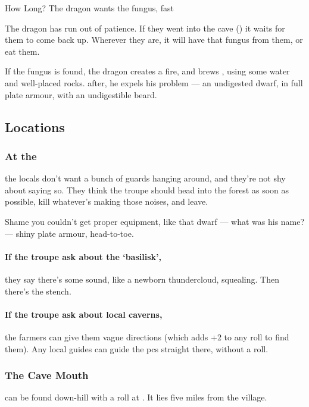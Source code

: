 \documentclass[10pt,twoside]{book}
\begin{document}
{How Long?}%
{The dragon wants the fungus, fast}%

The dragon has run out of patience.
If they went into the cave () it waits for them to come back up.
Wherever they are, it will have that fungus from them, or eat them.

If the fungus is found, the dragon creates a fire, and brews , using some water and well-placed rocks.
 after, he expels his problem --- an undigested dwarf, in full plate armour, with an undigestible beard.

\subsection{Locations}

\subsubsection{At the }\label{wyrmBailey}
the locals don't want a bunch of \glspl{guard} hanging around, and they're not shy about saying so.
They think the troupe should head into the forest as soon as possible, kill whatever's making those noises, and leave.

\begin{speechtext}
  Shame you couldn't get proper equipment, like that dwarf --- what was his name? --- shiny plate armour, head-to-toe.
\end{speechtext}

\paragraph{If the troupe ask about the `\gls{basilisk}',}
they say there's some sound, like a newborn thundercloud, squealing.
Then there's the stench.

\paragraph{If the troupe ask about local caverns,}
the farmers can give them vague directions (which adds +2 to any roll to find them).
Any local guides can guide the \glspl{pc} straight there, without a roll.

\subsubsection{The Cave Mouth}\label{caveMouth}
can be found down-hill with a  roll at \tn[12].
It lies five miles from the \gls{village}.
\end{document}

